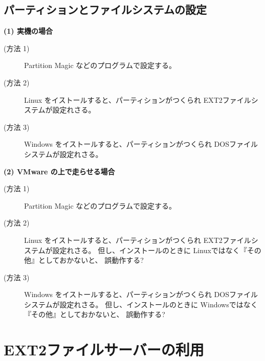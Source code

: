 \section{パーティションとファイルシステムの設定}

{\bf  (1) 実機の場合}

      \begin{description}
      \item[(方法 1)]   Partition Magic などのプログラムで設定する。

      \item[(方法 2)]  Linux をイストールすると、パーティションがつくられ
        EXT2ファイルシステムが設定れさる。

      \item[(方法 3)]   Windows をイストールすると、パーティションがつくられ
        DOSファイルシステムが設定れさる。
     \end{description}

{\bf (2) VMware の上で走らせる場合}

      \begin{description}
      \item[(方法 1)]    Partition Magic などのプログラムで設定する。

      \item[(方法 2)]   Linux をイストールすると、パーティションがつくられ
                   EXT2ファイルシステムが設定れさる。
                   但し、インストールのときに Linuxではなく『その他』としておかないと、
                   誤動作する?

      \item[(方法 3)]    Windows をイストールすると、パーティションがつくられ
                   DOSファイルシステムが設定れさる。
                   但し、インストールのときに Windowsではなく『その他』としておかないと、
                   誤動作する?
      \end{description}
    

\chapter{EXT2ファイルサーバーの利用}

